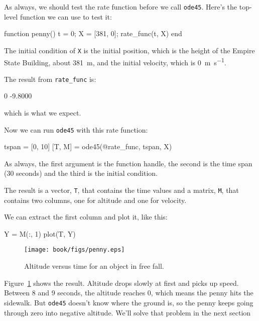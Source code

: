 
As always, we should test the rate function before we call {\tt ode45}.  Here's the top-level function we can use to test it:

\begin{code}
function penny()
   t = 0;
   X = [381, 0];
   rate_func(t, X)
end
\end{code}

The initial condition of {\tt X} is the initial position, which is the height of the Empire State Building, about \SI{381}{\meter}, and the initial velocity, which is \SI{0}{\meter \per \second}.


The result from \verb"rate_func" is:

\begin{code}
    0
   -9.8000
\end{code}

which is what we expect.

Now we can run {\tt ode45} with this rate function:

\begin{code}
tspan = [0, 10]
[T, M] = ode45(@rate_func, tspan, X)
\end{code}

As always, the first argument is the function handle, the second
is the time span (30 seconds) and the third is the initial
condition.

The result is a vector, {\tt T}, that contains the time values and a matrix, {\tt M}, that contains two columns, one for altitude and one for velocity.

We can extract the first column and plot it, like this:

\begin{code}
Y = M(:, 1)
plot(T, Y)
\end{code}


\begin{figure}
\centerline{\texttt{[image: book/figs/penny.eps]}}
\caption{Altitude versus time for an object in free fall.}
\label{fig:penny}
\end{figure}

Figure~\ref{fig:penny} shows the result.  Altitude drops slowly at first and picks up speed.  Between 8 and 9 seconds, the altitude reaches 0, which means the penny hits the sidewalk.  But {\tt ode45} doesn't know where the ground is, so the penny keeps going through zero into negative altitude.  We'll solve that problem in the next section

